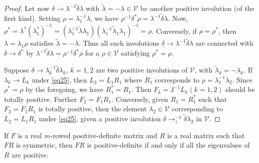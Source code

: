 \begin{proof}
Let now $\delta \rightarrow \lambda^{-1} \widetilde{\delta} \lambda$
with $\widetilde{\lambda} = - \lambda \in \mathscr{V}$ be another
positive involution (of the first kind). Setting
$\rho=\lambda^{-1}_1\lambda$, we have $\rho^{-1}\delta^{\ast}\rho =
\lambda^{-1} \widetilde{\delta}\lambda$. Now, $\rho^{\ast} =
\lambda^{\ast} (\lambda^{\ast}_1)^{-1} = (\lambda^{-1}_1
\widetilde{\lambda} \lambda_1) (\lambda^{-1}_1 \widetilde{\lambda}_1
\lambda_1)^{-1}=\rho$. Conversely, if $\rho=\rho^{\ast}$, then
$\lambda = \lambda_1 \rho$ satisfies $\widetilde{\lambda} = -
\lambda$. Thus all such involutions $\delta \rightarrow \lambda^{-1}
\widetilde{\delta} \lambda$ are connected with $\delta \rightarrow
\delta^{\ast}$ by $\lambda^{-1} \widetilde{\delta} \lambda = \rho^{-1}
\delta^{\ast} \rho$ for a $\rho \in \mathscr{V}$ satisfying
$\rho^{\ast}=\rho$.

Suppose $\delta \rightarrow \lambda^{-1}_k \widetilde{\delta}
\lambda_k$, $k=1,2$ are two positive involutions of $\mathscr{V}$,
with $\widetilde{\lambda}_k = - \lambda_k$. If $\lambda_k \rightarrow
L_k$ under \ref{eq25}, then $L_2 = L_1 R_1$ where $R_1$ corresponds to $\rho
= \lambda^{-1}_1 \lambda_2$. Since $\rho^{\ast} =\rho$ by the
foregoing, we have $R^{\ast}_1 = R_1$. Then $F_k = \mathsf{J}^{-1} L_k
(k=1,2)$ should be totally positive. Further $F_2 = F_1
R_1$. Conversely, given $R_1 = R^{\ast}_1$ such that $F_2 = F_1 R_1$
is totally positive, then the element $\lambda_2 \in \mathscr{V}$
corresponding to $L_2 = L_1 R_1$ under \eqref{eq25}, given a positive
involution $\delta \rightarrow^{-1}_z \widetilde{\delta} \lambda_2$ in
$\mathscr{V}$. 
\end{proof}

\begin{lem}\label{chap1:lem2}
If $F$ is a real $m$-rowed positive-definite matrix and $R$ is a real
matrix such that $F R$ is symmetric, then $F R$ is positive-definite
if and only if all the eigenvalues of $R$ are positive.
\end{lem}

